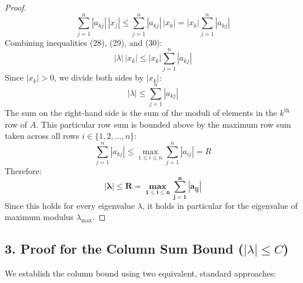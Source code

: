 \documentclass[11pt,a4paper]{article}
\newcommand{\abs}[1]{\left\lvert#1\right\rvert}
\begin{document}
\begin{proof}
\begin{equation}
\sum_{j=1}^n \abs{a_{kj}} \, \abs{x_j} \le \sum_{j=1}^n \abs{a_{kj}} \, \abs{x_k} = \abs{x_k} \sum_{j=1}^n \abs{a_{kj}}
\end{equation}
Combining inequalities (28), (29), and (30):
\begin{equation}
\abs{\lambda} \, \abs{x_k} \le \abs{x_k} \sum_{j=1}^n \abs{a_{kj}}
\end{equation}
Since $\abs{x_k} > 0$, we divide both sides by $\abs{x_k}$:
\begin{equation}
\abs{\lambda} \le \sum_{j=1}^n \abs{a_{kj}}
\end{equation}
The sum on the right-hand side is the sum of the moduli of elements in the $k^{\text{th}}$ row of $A$. This particular row sum is bounded above by the maximum row sum taken across all rows $i \in \{1, 2, \dots, n\}$:
\begin{equation}
\sum_{j=1}^n \abs{a_{kj}} \le \max_{1 \le i \le n} \sum_{j=1}^n \abs{a_{ij}} = R
\end{equation}
Therefore:
\begin{equation}
\mathbf{\abs{\lambda} \le R = \max_{1 \le i \le n} \sum_{j=1}^n \abs{a_{ij}}}
\end{equation}
Since this holds for every eigenvalue $\lambda$, it holds in particular for the eigenvalue of maximum modulus $\lambda_{\max}$.
\end{proof}

\subsection*{3. Proof for the Column Sum Bound ($\abs{\lambda} \le C$)}
We establish the column bound using two equivalent, standard approaches:
\end{document}
